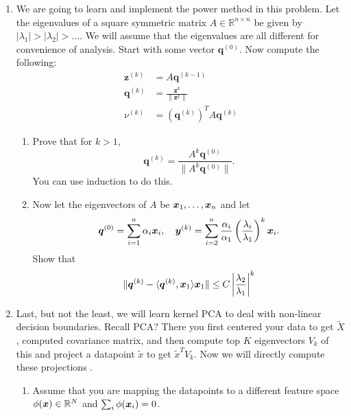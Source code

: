 \documentclass[11pt]{article}
\begin{document}
\begin{enumerate}
\newcommand{\by}{\boldsymbol{y}}
\newcommand{\bz}{\boldsymbol{z}}
\newcommand{\bq}{\boldsymbol{q}}
\newcommand{\bo}{\boldsymbol{1}}

\item We are going to learn and implement the power method in this problem. Let the eigenvalues of a square symmetric matrix $A\in \mathbb{R}^{n\times n}$ be given by $|\lambda_1|>|\lambda_2| > \dots$. We will assume that the eigenvalues are all different for convenience of analysis. Start with some vector $\bq^{(0)}$. Now compute the following:
\begin{align}
\bz^{(k)}&=A\bq^{(k-1)}\\
\bq^{(k)}&=\frac{\bz^{k}}{\|\bz^{k}\|}\\
\nu^{(k)}&=(\bq^{(k)})^TA\bq^{(k)}
\end{align}
\begin{enumerate}
\item Prove that for $k>1$, $$\bq^{(k)}=\frac{A^k \bq^{(0)}}{\|A^k \bq^{(0)}\|}.$$ You can use induction to do this.
\item Now let the eigenvectors of $A$ be $\boldsymbol{x}_1,\dots,\boldsymbol{x}_n$ and let $$\bq^{(0)}=\sum_{i=1}^n\alpha_i\bx_i,\ \ \ \by^{(k)}=\sum_{i=2}^n \frac{\alpha_i}{\alpha_1} \left(\frac{\lambda_i}{\lambda_1}\right)^k\bx_i.$$
Show that \begin{align*}
\|\bq^{(k)}-\langle\bq^{(k)},\bx_1\rangle \bx_1\|\leq C\left|\frac{\lambda_2}{\lambda_1}\right|^k
\end{align*}
\end{enumerate}
\item Last, but not the least, we will learn kernel PCA to deal with non-linear decision boundaries.
Recall PCA? There you first centered your data to get $\tilde{X}$, computed covariance matrix, and then compute top $K$ eigenvectors $V_k$ of this and project a datapoint $\tilde{x}$ to get $\tilde{x}^TV_k$. Now we will directly compute these projections .
\begin{enumerate}
\item Assume that you are mapping the datapoints to a different feature space $\phi(\boldsymbol{x})\in \mathbb{R}^N$ and $\sum_i \phi(\boldsymbol{x}_i)=0$.

\end{enumerate}
\end{enumerate}
\end{document}
